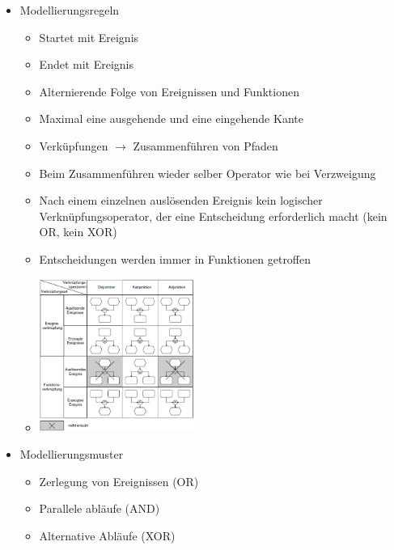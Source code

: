 \documentclass[11pt,a4paper]{article}
\begin{document}
\begin{itemize}
	\item Modellierungsregeln
	 	\begin{itemize}
	 	\item Startet mit Ereignis
	 	\item Endet mit Ereignis
	 	\item Alternierende Folge von Ereignissen und Funktionen
	 	\item Maximal eine ausgehende und eine eingehende Kante
	 	\item Verküpfungen $\rightarrow$ Zusammenführen von Pfaden
	 	\item Beim Zusammenführen wieder selber Operator wie bei Verzweigung
	 	\item Nach einem einzelnen auslösenden Ereignis kein logischer Verknüpfungsoperator, der eine Entscheidung erforderlich macht (kein OR, 	
	 		  kein XOR)
	 	\item Entscheidungen werden immer in Funktionen getroffen
	 	\item[] \includegraphics[height=5cm]{Bilder/rulesaris}
	 	\end{itemize}
	 	
	 \item Modellierungsmuster
	 	\begin{itemize}
	 	\item Zerlegung von Ereignissen (OR)
	 	\item Parallele abläufe (AND)
	 	\item Alternative Abläufe (XOR)
	 	\end{itemize}
			
\end{itemize}
\end{document}
